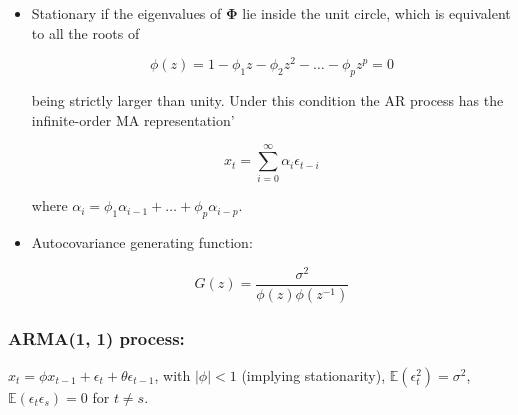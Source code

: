 \documentclass{article}
\newcommand{\E}{\mathbb{E}}
\begin{document}
\begin{itemize}

\item Stationary if the eigenvalues of \(\boldsymbol{\Phi}\) lie inside the unit circle, which is equivalent to all the roots of

\[
\phi(z) = 1 - \phi_1 z - \phi_2 z^2 - \ldots - \phi_p z^p = 0
\]

being strictly larger than unity. Under this condition the AR process has the infinite-order MA representation'

\[
x_t = \sum_{i=0}^\infty \alpha_i \epsilon_{t-i}
\]

where \(\alpha_i = \phi_1 \alpha_{i-1} + \ldots + \phi_p \alpha_{i - p}\).

\item Autocovariance generating function:

\[
G(z) = \frac{\sigma^2}{\phi(z) \phi(z^{-1})}
\]

\end{itemize}


\subsubsection{ARMA(1, 1) process:} \(x_t = \phi x_{t-1} + \epsilon_t + \theta \epsilon_{t-1}\), with \(|\phi| < 1\) (implying stationarity), \(\E(\epsilon_t^2) = \sigma^2\), \(\E(\epsilon_t \epsilon_s ) = 0 \) for \(t \neq s\).
\end{document}
